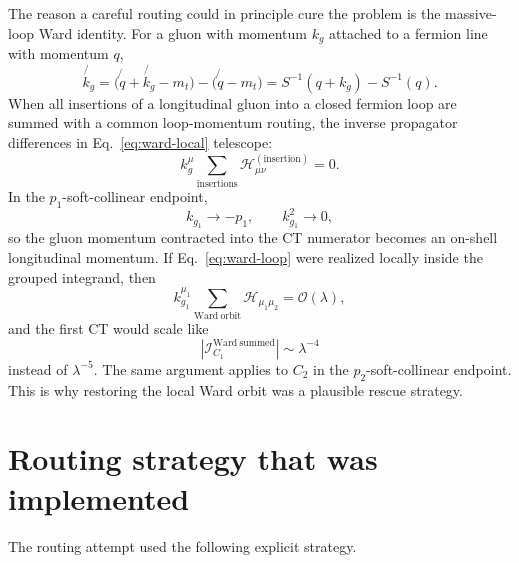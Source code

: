 \documentclass[11pt]{report}
\newcommand{\slashp}[1]{\not{#1}}
\newcommand{\kgone}{k_{g_1}}
\newcommand{\order}[1]{\mathcal{O}\!\left(#1\right)}
\newcommand{\Hamp}{\mathcal{H}}
\newcommand{\ICTone}{\mathcal{I}_{C_1}}
\begin{document}
The reason a careful routing could in principle cure the problem is the
massive-loop Ward identity. For a gluon with momentum \(k_g\) attached to a
fermion line with momentum \(q\),
\[
  \slashp{k_g}
  =
  \bigl(\slashp{q}+\slashp{k_g}-m_t\bigr)
  -
  \bigl(\slashp{q}-m_t\bigr)
  =
  S^{-1}(q+k_g)-S^{-1}(q).
  \label{eq:ward-local}
\]
When all insertions of a longitudinal gluon into a closed fermion loop are
summed with a common loop-momentum routing, the inverse propagator differences
in Eq.~\eqref{eq:ward-local} telescope:
\[
  k_g^\mu
  \sum_{\mathrm{insertions}}\Hamp_{\mu\nu}^{(\mathrm{insertion})}
  =
  0.
  \label{eq:ward-loop}
\]
In the \(p_1\)-soft-collinear endpoint,
\[
  \kgone \longrightarrow -p_1,\qquad \kgone^2\longrightarrow 0,
\]
so the gluon momentum contracted into the CT numerator becomes an on-shell
longitudinal momentum. If Eq.~\eqref{eq:ward-loop} were realized locally
inside the grouped integrand, then
\[
  \kgone^{\mu_1}
  \sum_{\mathrm{Ward\ orbit}}\Hamp_{\mu_1\mu_2}
  =
  \order{\lambda},
\]
and the first CT would scale like
\[
  |\ICTone^{\mathrm{Ward\ summed}}|
  \sim
  \lambda^{-4}
\]
instead of \(\lambda^{-5}\). The same argument applies to \(C_2\) in the
\(p_2\)-soft-collinear endpoint. This is why restoring the local Ward orbit
was a plausible rescue strategy.

\section{Routing strategy that was implemented}

The routing attempt used the following explicit strategy.
\end{document}
